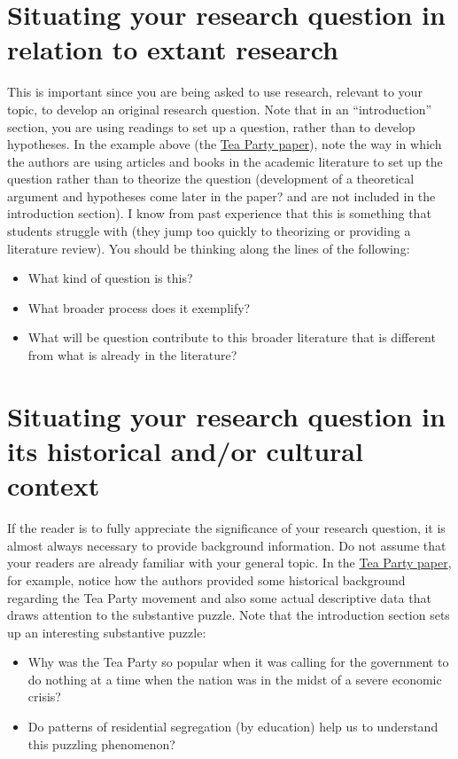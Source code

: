\documentclass[12pt]{article}
\begin{document}
\section{{\textbf{Situating your research question in relation to extant research}}}
\begin{singlespace}
This is important since you are being asked to use research, relevant to your topic, to develop an original research question. Note that in an ``introduction'' section, you are using readings to set up a question, rather than to develop hypotheses. In the example above (the \href{http://asr.sagepub.com/content/79/4/630.full.pdf}{Tea Party paper}), note the way in which the authors are using articles and books in the academic literature to set up the question rather than to theorize the question (development of a theoretical argument and hypotheses come later in the paper? and are not included in the introduction section). I know from past experience that this is something that students struggle with (they jump too quickly to theorizing or providing a literature review).  You should be thinking along the lines of the following: 
\begin{itemize}
\item What kind of question is this? 
\item What broader process does it exemplify? 
\item What will be question contribute to this broader literature that is different from what is already in the literature?
\end{itemize}
\end{singlespace}

\section{{\textbf{Situating your research question in its historical and/or cultural context}}}
\begin{singlespace}
If the reader is to fully appreciate the significance of your research question, it is almost always necessary to provide background information. Do not assume that your readers are already familiar with your general topic. In the \href{http://asr.sagepub.com/content/79/4/630.full.pdf}{Tea Party paper}, for example, notice how the authors provided some historical background regarding the Tea Party movement and also some actual descriptive data that draws attention to the substantive puzzle. Note that the introduction section sets up an interesting substantive puzzle:
\begin{itemize}
\item Why was the Tea Party so popular when it was calling for the government to do nothing at a time when the nation was in the midst of a severe economic crisis? 
\item Do patterns of residential segregation (by education) help us to understand this puzzling phenomenon?
\end{itemize}
\end{singlespace}
\end{document}
